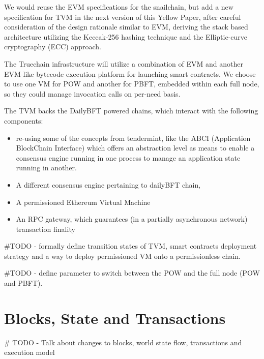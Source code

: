 \documentclass[9pt,oneside]{amsart}
\begin{document}
\begin{multicols}{2}
We would reuse the EVM specifications for the snailchain, but add a new specification for TVM in the next version of this Yellow Paper,
after careful consideration of the design rationale similar to EVM, deriving the stack based architecture utilizing the Keccak-256
hashing technique and the Elliptic-curve cryptography (ECC) approach.

The Truechain infrastructure will utilize a combination of EVM and another EVM-like bytecode execution platform for launching smart contracts.
We choose to use one VM for POW and another for PBFT, embedded within each full node, so they could manage invocation calls on per-need basis.

The TVM backs the DailyBFT powered chains, which interact with the following components:
\begin{itemize}
  \item re-using some of the concepts from tendermint, like the ABCI (Application BlockChain Interface) which offers
  an abstraction level as means to enable a consensus engine running in one process to manage an application state running in another.
  \item A different consensus engine pertaining to dailyBFT chain,
  \item A permissioned Ethereum Virtual Machine
  \item An RPC gateway, which guarantees (in a partially asynchronous network) transaction finality
\end{itemize}

\#TODO - formally define transition states of TVM, smart contracts deployment strategy
and a way to deploy permissioned VM onto a permissionless chain.

\#TODO - define parameter to switch between the POW and the full node (POW and PBFT).

\section{Blocks, State and Transactions}

\# TODO - Talk about changes to blocks, world state flow, transactions and execution model



\end{multicols}
\end{document}
